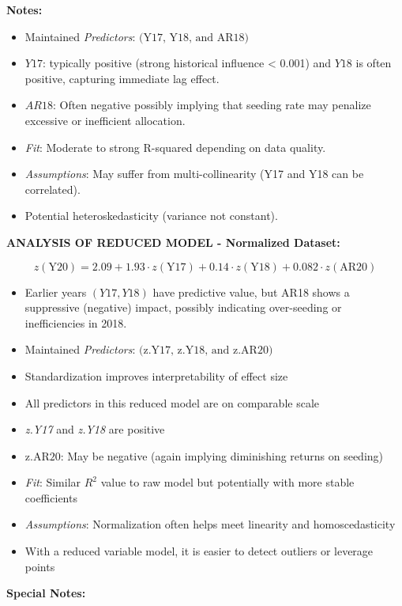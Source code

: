 \documentclass[
]{article}
\begin{document}
\textbf{Notes:}

\begin{itemize}
\item
  Maintained \emph{Predictors}: \(\text{(Y17, Y18, and AR18)}\)
\item
  \(Y17\): typically positive (strong historical influence \textless{}
  0.001) and \(Y18\) is often positive, capturing immediate lag effect.
\item
  \(AR18\): Often negative possibly implying that seeding rate may
  penalize excessive or inefficient allocation.
\item
  \emph{Fit}: Moderate to strong R-squared depending on data quality.
\item
  \emph{Assumptions}: May suffer from multi-collinearity (Y17 and Y18
  can be correlated).
\item
  Potential heteroskedasticity (variance not constant).
\end{itemize}

\textbf{ANALYSIS OF REDUCED MODEL - Normalized Dataset:}

\[
z(\text{Y20}) = 2.09 + 1.93 \cdot z(\text{Y17}) + 0.14 \cdot z(\text{Y18}) + 0.082 \cdot z(\text{AR20})
\]

\begin{itemize}
\item
  Earlier years \((Y17, Y18)\) have predictive value, but AR18 shows a
  suppressive (negative) impact, possibly indicating over-seeding or
  inefficiencies in 2018.
\item
  Maintained \emph{Predictors}: \(\text{(z.Y17, z.Y18, and z.AR20)}\)
\item
  Standardization improves interpretability of effect size
\item
  All predictors in this reduced model are on comparable scale
\item
  \emph{z.Y17} and \emph{z.Y18} are positive
\item
  \(\text{z.AR20}\): May be negative (again implying diminishing returns
  on seeding)
\item
  \emph{Fit}: Similar \(R^2\) value to raw model but potentially with
  more stable coefficients
\item
  \emph{Assumptions}: Normalization often helps meet linearity and
  homoscedasticity
\item
  With a reduced variable model, it is easier to detect outliers or
  leverage points
\end{itemize}

\textbf{Special Notes:}
\end{document}
